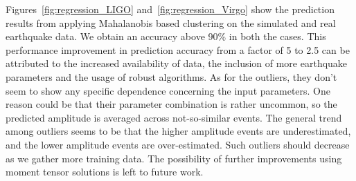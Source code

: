 \documentclass[twocolumn, aps, superscriptaddress]{revtex4}
\newcommand{\rednote}[1]{{\color{red} (#1)}}
\begin{document}
Figures~\ref{fig:regression_LIGO} and~\ref{fig:regression_Virgo} show the prediction results from applying Mahalanobis based clustering on the simulated and real earthquake data. We obtain an accuracy above 90\% in both the cases. This performance improvement in prediction accuracy from a factor of 5 to 2.5 can be attributed to the increased availability of data, the inclusion of more earthquake parameters and the usage of robust algorithms.  As for the outliers, they don't seem to show any specific dependence concerning the input parameters. One reason could be that their parameter combination is rather uncommon, so the predicted amplitude is averaged across not-so-similar events. The general trend among outliers seems to be that the higher amplitude events are underestimated, and the lower amplitude events are over-estimated. Such outliers should decrease as we gather more training data. The possibility of further improvements using moment tensor solutions is left to future work.  

\end{document}
